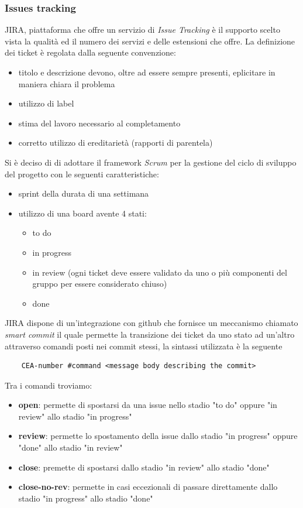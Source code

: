 	\subsubsection{Issues tracking}
	JIRA, piattaforma che offre un servizio di \textit{Issue Tracking} è il supporto scelto vista la qualità ed il numero dei servizi e delle estensioni che offre.
	\newline
	La definizione dei ticket è regolata dalla seguente convenzione:
	\begin{itemize}
		\item titolo e descrizione devono, oltre ad essere sempre presenti, eplicitare in maniera chiara il problema
		\item utilizzo di label
		\item stima del lavoro necessario al completamento
		\item corretto utilizzo di ereditarietà (rapporti di parentela)
	\end{itemize}
	Si è deciso di di adottare il framework \textit{Scrum} per la gestione del ciclo di sviluppo del progetto con le seguenti caratteristiche:
	\begin{itemize}
		\item sprint della durata di una settimana
		\item utilizzo di una board avente 4 stati:
		\begin{itemize}
			\item to do
			\item in progress
			\item in review (ogni ticket deve essere validato da uno o più componenti del gruppo per essere considerato chiuso)
			\item done
		\end{itemize}
	\end{itemize}

	JIRA dispone di un'integrazione con github che fornisce un meccanismo chiamato \textit{smart commit} il quale permette la transizione dei ticket da uno stato ad un'altro attraverso comandi posti nei commit stessi, la sintassi utilizzata è la seguente
	\begin{lstlisting}
	CEA-number #command <message body describing the commit>
	\end{lstlisting}
	Tra i comandi troviamo:
	\begin{itemize}
		\item \textbf{open}: permette di spostarsi da una issue nello stadio "to do" oppure "in review" allo stadio "in progress"
		\item \textbf{review}: permette lo spostamento della issue dallo stadio "in progress" oppure "done" allo stadio "in review"
		\item \textbf{close}: premette di spostarsi dallo stadio "in review" allo stadio "done"
		\item \textbf{close-no-rev}: permette in casi eccezionali di passare direttamente dallo stadio "in progress" allo stadio "done"
	\end{itemize}